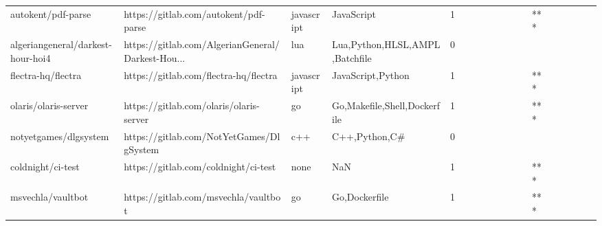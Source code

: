 \begin{tabular}{llllrlllllllllllll}
autokent/pdf-parse                                 &              https://gitlab.com/autokent/pdf-parse &        javascript &                                         JavaScript &       1 &         &        &           &                &                 &        &           &       *** &          &          &       &              &          \\
algeriangeneral/darkest-hour-hoi4                  &  https://gitlab.com/AlgerianGeneral/Darkest-Hou... &               lua &                     Lua,Python,HLSL,AMPL,Batchfile &       0 &         &        &           &                &                 &        &           &           &          &          &       &              &          \\
flectra-hq/flectra                                 &              https://gitlab.com/flectra-hq/flectra &        javascript &                                  JavaScript,Python &       1 &         &        &           &                &                 &        &           &       *** &          &          &       &              &          \\
olaris/olaris-server                               &            https://gitlab.com/olaris/olaris-server &                go &                       Go,Makefile,Shell,Dockerfile &       1 &         &        &           &                &                 &        &           &       *** &          &          &       &              &          \\
notyetgames/dlgsystem                              &           https://gitlab.com/NotYetGames/DlgSystem &               c++ &                                      C++,Python,C\# &       0 &         &        &           &                &                 &        &           &           &          &          &       &              &          \\
coldnight/ci-test                                  &               https://gitlab.com/coldnight/ci-test &              none &                                                NaN &       1 &         &        &           &                &                 &        &           &       *** &          &          &       &              &          \\
msvechla/vaultbot                                  &               https://gitlab.com/msvechla/vaultbot &                go &                                      Go,Dockerfile &       1 &         &        &           &                &                 &        &           &       *** &          &          &       &              &          \\

\end{tabular}
